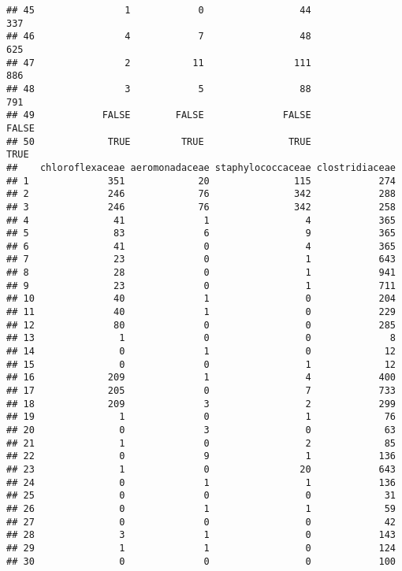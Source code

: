 \documentclass[12pt]{beamer}\usepackage[]{graphicx}\usepackage[]{color}
\makeatletter
\newenvironment{kframe}{%
 \def\at@end@of@kframe{}%
 \ifinner\ifhmode%
  \def\at@end@of@kframe{\end{minipage}}%
  \begin{minipage}{\columnwidth}%
 \fi\fi%
 \def\FrameCommand##1{\hskip\@totalleftmargin \hskip-\fboxsep
 \colorbox{shadecolor}{##1}\hskip-\fboxsep
     \hskip-\linewidth \hskip-\@totalleftmargin \hskip\columnwidth}%
 \MakeFramed {\advance\hsize-\width
   \@totalleftmargin\z@ \linewidth\hsize
   \@setminipage}}%
 {\par\unskip\endMakeFramed%
 \at@end@of@kframe}
\newenvironment{knitrout}{}{} %
\makeatother
\begin{document}
\begin{frame}[fragile]
\begin{knitrout}
\begin{kframe}
\begin{verbatim}
## 45                1            0                 44                 337
## 46                4            7                 48                 625
## 47                2           11                111                 886
## 48                3            5                 88                 791
## 49            FALSE        FALSE              FALSE               FALSE
## 50             TRUE         TRUE               TRUE                TRUE
##    chloroflexaceae aeromonadaceae staphylococcaceae clostridiaceae
## 1              351             20               115            274
## 2              246             76               342            288
## 3              246             76               342            258
## 4               41              1                 4            365
## 5               83              6                 9            365
## 6               41              0                 4            365
## 7               23              0                 1            643
## 8               28              0                 1            941
## 9               23              0                 1            711
## 10              40              1                 0            204
## 11              40              1                 0            229
## 12              80              0                 0            285
## 13               1              0                 0              8
## 14               0              1                 0             12
## 15               0              0                 1             12
## 16             209              1                 4            400
## 17             205              0                 7            733
## 18             209              3                 2            299
## 19               1              0                 1             76
## 20               0              3                 0             63
## 21               1              0                 2             85
## 22               0              9                 1            136
## 23               1              0                20            643
## 24               0              1                 1            136
## 25               0              0                 0             31
## 26               0              1                 1             59
## 27               0              0                 0             42
## 28               3              1                 0            143
## 29               1              1                 0            124
## 30               0              0                 0            100

\end{verbatim}
\end{kframe}
\end{knitrout}
\end{frame}
\end{document}
